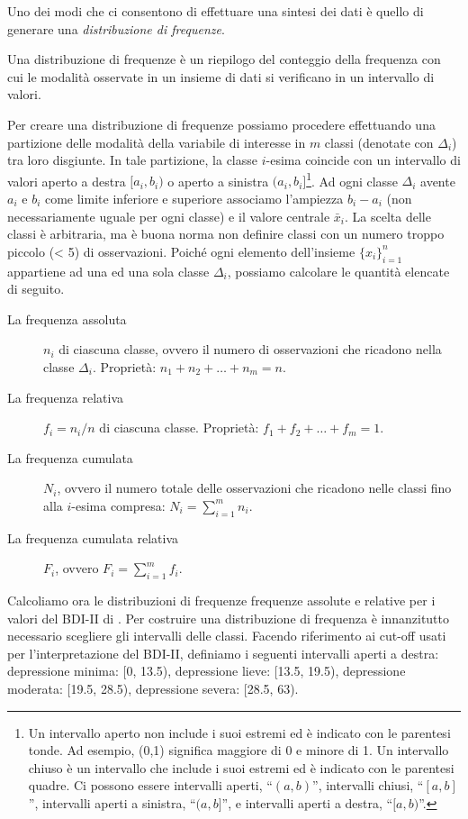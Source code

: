 Uno dei modi che ci consentono di effettuare una sintesi dei dati è quello di generare una \emph{distribuzione di frequenze}.
\begin{defn}
Una distribuzione di frequenze è un riepilogo del conteggio della frequenza con cui le modalità osservate in un insieme di dati si verificano in un intervallo di valori. 
\end{defn}
Per creare una distribuzione di frequenze possiamo procedere effettuando una partizione delle modalità della variabile di interesse in $m$ classi (denotate con $\Delta_i$) tra loro disgiunte.  
In tale partizione, la classe $i$-esima coincide con un intervallo di valori aperto a destra $[a_i, b_i)$ o aperto a sinistra $(a_i, b_i]$\footnote{
Un intervallo aperto non include i suoi estremi ed è indicato con le parentesi tonde. 
Ad esempio, (0,1) significa maggiore di 0 e minore di 1. 
Un intervallo chiuso è un intervallo che include i suoi estremi ed è indicato con le parentesi quadre.
Ci possono essere intervalli aperti, ``$(a, b)$'', intervalli chiusi, ``$[a, b]$'', intervalli aperti a sinistra, ``$(a, b]$'', e intervalli aperti a destra, ``$[a, b)$''.
}.
Ad ogni classe $\Delta_i$ avente $a_i$ e $b_i$ come limite inferiore e superiore  associamo l'ampiezza $b_i - a_i$ (non necessariamente uguale per ogni classe) e il valore centrale $\bar{x}_i$. 
La scelta delle classi è arbitraria, ma è buona norma non definire classi con un numero troppo piccolo (< 5) di osservazioni. 
Poiché ogni elemento dell'insieme $\{x_i\}_{i=1}^n$ appartiene ad una ed una sola classe $\Delta_i$, possiamo calcolare le quantità elencate di seguito.
\begin{description}
\item[La frequenza assoluta] $n_i$ di ciascuna classe, ovvero il numero di osservazioni che ricadono nella classe $\Delta_i$. Proprietà: $n_1 + n_2 + \dots + n_m = n$.
\item[La frequenza relativa] $f_i = n_i/n$ di ciascuna classe. 
Proprietà: $f_1+f_2+\dots+f_m =1$.
\item[La frequenza cumulata] $N_i$, ovvero il numero totale delle osservazioni che ricadono nelle classi fino alla $i$-esima compresa:
$N_i = \sum_{i=1}^m n_i.$
\item[La frequenza cumulata relativa] $F_i$, ovvero $F_i = 
\sum_{i=1}^m f_i.$
\end{description}

Calcoliamo ora le distribuzioni di frequenze frequenze assolute e relative per i valori del BDI-II di \citet{zetsche_future_2019}. 
Per costruire una distribuzione di frequenza è innanzitutto necessario scegliere gli intervalli delle classi.
Facendo riferimento ai cut-off usati per l'interpretazione del BDI-II, definiamo i seguenti intervalli aperti a destra:
depressione minima: [0, 13.5),
depressione lieve: [13.5, 19.5),
depressione moderata: [19.5, 28.5),
depressione severa: [28.5, 63).

